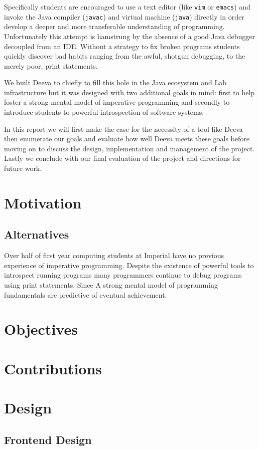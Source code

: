 \documentclass[11pt, a4paper]{article}
\newcommand{\cmd}[1]{{\tt #1}}
\begin{document}
Specifically students are encouraged to use a text editor (like \cmd{vim} or \cmd{emacs}) and invoke the Java compiler (\cmd{javac}) and virtual machine (\cmd{java}) directly in order develop a deeper and more transferable understanding of programming.
Unfortunately this attempt is hamstrung by the absence of a good Java debugger decoupled from an IDE.
Without a strategy to fix broken programs students quickly discover bad habits ranging from the awful, shotgun debugging, to the merely poor, print statements.

We built Deeva to chiefly to fill this hole in the Java ecosystem and Lab infrastructure but it was designed with two additional goals in mind:
first to help foster a strong mental model of imperative programming and secondly to introduce students to powerful introspection of software systems.

In this report we will first make the case for the necessity of a tool like Deeva then enumerate our goals and evaluate how well Deeva meets these goals before moving on to discuss the design, implementation and management of the project. 
Lastly we conclude with our final evaluation of the project and directions for future work.

\section{Motivation}
\subsection{Alternatives}
Over half of first year computing students at Imperial have no previous experience of imperative programming.
Despite the existence of powerful tools to introspect running programs many programmers continue to debug programs using print statements.
Since 
A strong mental model of programming fundamentals are predictive of eventual achievement.

\section{Objectives}
\section{Contributions}
\section{Design}
\subsection{Frontend Design}
\end{document}
